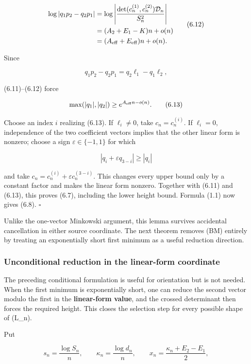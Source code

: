 \documentclass[
  11pt,
]{article}
\begin{document}
\[
 \begin{aligned}
 \log|q_1p_2-q_2p_1|
 &=\log\left|
 \frac{\det(c_n^{(1)},c_n^{(2)})\mathcal D_n}{S_n^2}
 \right|\\
 &=(A_2+E_1-K)n+o(n)\\
 &=(A_{\rm eff}+E_{\rm eff})n+o(n).
 \end{aligned}                                      \tag{6.12}
\]

Since

\[
 q_1p_2-q_2p_1=q_2\ell_1-q_1\ell_2,
\]

(6.11)--(6.12) force

\[
 \max(|q_1|,|q_2|)\ge e^{A_{\rm eff}n-o(n)}.         \tag{6.13}
\]

Choose an index \(i\) realizing (6.13). If \(\ell_i\ne0\), take
\(c_n=c_n^{(i)}\). If \(\ell_i=0\), independence of the two coefficient
vectors implies that the other linear form is nonzero; choose a sign
\(\varepsilon\in\{-1,1\}\) for which

\[
 |q_i+\varepsilon q_{3-i}|\ge |q_i|
\]

and take \(c_n=c_n^{(i)}+\varepsilon c_n^{(3-i)}\). This changes every
upper bound only by a constant factor and makes the linear form nonzero.
Together with (6.11) and (6.13), this proves (6.7), including the lower
height bound. Formula (1.1) now gives (6.8). \(\square\)

Unlike the one-vector Minkowski argument, this lemma survives accidental
cancellation in either source coordinate. The next theorem removes (BM)
entirely by treating an exponentially short first minimum as a useful
reduction direction.

\hypertarget{unconditional-reduction-in-the-linear-form-coordinate}{%
\subsubsection{Unconditional reduction in the linear-form
coordinate}\label{unconditional-reduction-in-the-linear-form-coordinate}}

The preceding conditional formulation is useful for orientation but is
not needed. When the first minimum is exponentially short, one can
reduce the second vector modulo the first in the \textbf{linear-form
value}, and the crossed determinant then forces the required height.
This closes the selection step for every possible shape of (L\_n).

Put

\[
 s_n=\frac{\log S_n}{n},\qquad
 \kappa_n=\frac{\log d_n}{n},\qquad
 x_n=\frac{\kappa_n+E_2-E_1}{2},                    \tag{6.14}
\]
\end{document}
